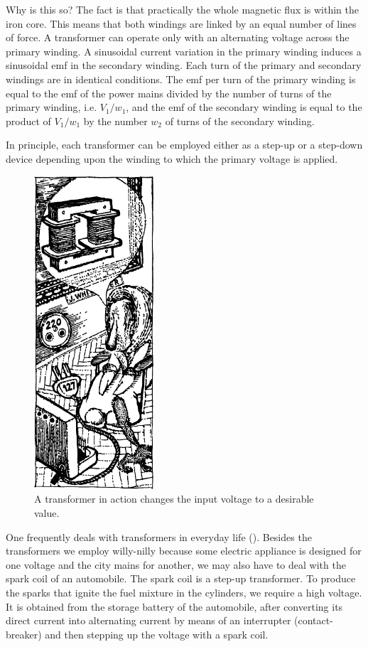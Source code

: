 Why is this so? The fact is that practically the whole magnetic flux is within the iron core. This means that both windings are linked by an equal number of lines of force. A transformer can operate only with an alternating voltage across the primary winding. A sinusoidal current variation in the primary winding induces a sinusoidal emf in the secondary winding. Each turn of the primary and secondary windings are in identical conditions. The emf per turn of the primary winding is equal to the emf of the power mains divided by the number of turns of the primary winding, i.e. $V_{1}/w_{1}$, and the emf of the secondary winding is equal to the product of $V_{1}/w_{1}$ by the number $w_{2}$ of turns of the secondary winding.

In principle, each transformer can be employed either as a step-up or a step-down device depending upon the winding to which the primary voltage is applied.

\begin{figure}[!ht]
\centering
\includegraphics[width=0.4\textwidth]{figures/fig-04-04.pdf}
\caption{A transformer in action changes the input voltage to a desirable value.}
\label{fig-4.4}
\end{figure}


One frequently deals with transformers in everyday life (). Besides the transformers we employ willy-nilly because some electric appliance is designed for one voltage and the city mains for another, we may also have to deal with the spark coil of an automobile. The spark coil is a step-up transformer. To produce the sparks that ignite the fuel mixture in the cylinders, we require a high voltage. It is obtained from the storage battery of the automobile, after converting its direct current into alternating current by means of an interrupter (contact-breaker) and then stepping up the voltage with a spark coil.

